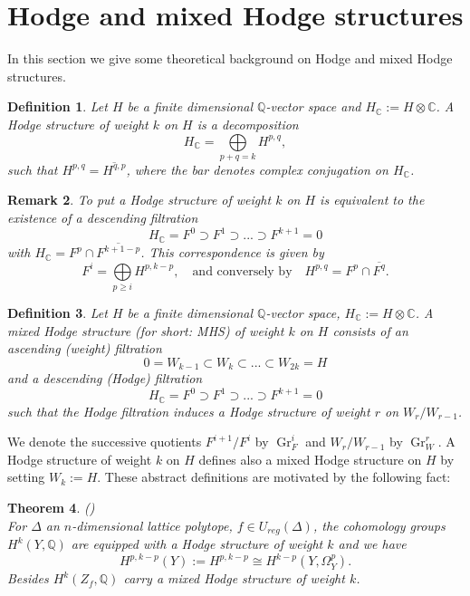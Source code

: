 \documentclass[12pt, english]{article}
\newtheorem{definition}{Definition}[section]
\newtheorem{remark}[definition]{Remark}
\newtheorem{theorem}[definition]{Theorem}
\DeclareMathOperator{\Gr}{Gr}
\begin{document}
\section{Hodge and mixed Hodge structures}

In this section we give some theoretical background on Hodge and mixed Hodge structures.

\begin{definition}
	Let $H$ be a finite dimensional $\mathbb{Q}$-vector space and $H_{\mathbb{C}} := H \otimes \mathbb{C}$. A Hodge structure of weight $k$ on $H$ is a decomposition 
	\[ H_{\mathbb{C}} = \bigoplus\limits_{p+q = k} H^{p,q},   \]
	such that $H^{p,q} = \overline{H^{q,p}}$, where the bar denotes complex conjugation on $H_{\mathbb{C}}$.
\end{definition}

\begin{remark}
	\normalfont
	To put a Hodge structure of weight $k$ on $H$ is equivalent to the existence of a descending filtration
	\[ H_{\mathbb{C}} = F^0 \supset F^1 \supset ... \supset F^{k+1} = 0  \]
	with $H_{\mathbb{C}} = F^p \cap \overline{F^{k+1-p}}$. This correspondence is given by
	\[ F^i = \bigoplus\limits_{p \geq i} H^{p,k-p}, \quad \textrm{and conversely by} \quad   H^{p,q} = F^p \cap \overline{F^q}.  \]
\end{remark}

\begin{definition}
	Let $H$ be a finite dimensional $\mathbb{Q}$-vector space, $H_{\mathbb{C}} := H \otimes \mathbb{C}$. A mixed Hodge structure (for short: MHS) of weight $k$ on $H$ consists of an ascending (weight) filtration
	\[ 0 = W_{k-1} \subset W_k \subset ... \subset W_{2k} = H \]
	and a descending (Hodge) filtration
	\[ H_{\mathbb{C}} = F^0 \supset F^1 \supset ... \supset F^{k+1} = 0  \]
	such that the Hodge filtration induces a Hodge structure of weight $r$ on $W_r/W_{r-1}$.
\end{definition}

We denote the successive quotients $F^{i+1}/F^i$ by $\Gr_F^i$ and $W_r/W_{r-1}$ by $\Gr_W^r$. A Hodge structure of weight $k$ on $H$ defines also a mixed Hodge structure on $H$ by setting $W_k := H$. These abstract definitions are motivated by the following fact:

\begin{theorem} (\cite{Del75}) \\
	For $\Delta$ an $n$-dimensional lattice polytope, $f \in U_{reg}(\Delta)$, the cohomology groups $H^k(Y, \mathbb{Q})$ are equipped with a Hodge structure of weight $k$ and we have 
	\[ H^{p,k-p}(Y):= H^{p,k-p} \cong H^{k-p}(Y, \Omega_{Y}^p). \]
	Besides $H^k(Z_f, \mathbb{Q})$ carry a mixed Hodge structure of weight $k$.
\end{theorem}
\end{document}
